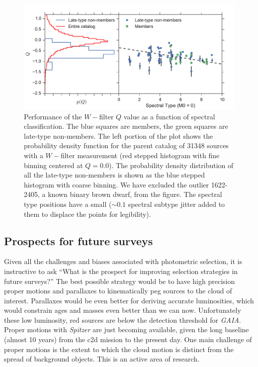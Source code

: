 \documentclass[12pt,preprint]{aastex}
\begin{document}
\begin{figure}[ht!]
  \caption{ Performance of the $W-$filter $Q$ value as a function of spectral classification.  The blue squares are members, the green squares are late-type non-members.  The left portion of the plot shows the probability density function for the parent catalog of 31348 sources with a $W-$filter measurement (red stepped histogram with fine binning centered at $Q=0.0$).  The probability density distribution of all the late-type non-members is shown as the blue stepped histogram with coarse binning. We have excluded the outlier 1622-2405, a known binary brown dwarf, from the figure.  The spectral type positions have a small ($\sim0.1$ spectral subtype jitter added to them to displace the points for legibility).\label{fig_W_results} }
\centering
\includegraphics[scale=0.6]{figures/W_filter_results}
\end{figure}

\subsection{Prospects for future surveys}
Given all the challenges and biases associated with photometric selection, it is instructive to ask ``What is the prospect for improving selection strategies in future surveys?''  The best possible strategy would be to have high precision proper motions and parallaxes to kinematically peg sources to the cloud of interest.  Parallaxes would be even better for deriving accurate luminosities, which would constrain ages and masses even better than we can now.  Unfortunately these low luminosity, red sources are below the detection threshold for \emph{GAIA}.  Proper motions with \emph{Spitzer} are just becoming available, given the long baseline (almost 10 years) from the c2d mission to the present day.  One main challenge of proper motions is the extent to which the cloud motion is distinct from the spread of background objects.  This is an active area of research.
\end{document}
